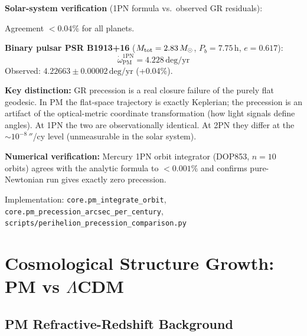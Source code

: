 \documentclass[10pt,twocolumn]{article}
\begin{document}
\textbf{Solar-system verification} (1PN formula vs.\ observed GR residuals):
\begin{center}
\end{center}
Agreement $<0.04\%$ for all planets.

\textbf{Binary pulsar PSR B1913+16} ($M_{\rm tot}=2.83\,M_\odot$, $P_b=7.75$\,h,
$e=0.617$):
\[
  \dot\omega_{\mathrm{PM}}^{\mathrm{1PN}} = 4.228\,\mathrm{deg/yr}
\]
Observed: $4.22663\pm0.00002\,\mathrm{deg/yr}$ (+0.04\%).

\textbf{Key distinction:}
GR precession is a real closure failure of the purely flat geodesic.
In PM the flat-space trajectory is exactly Keplerian; the precession is
an artifact of the optical-metric coordinate transformation (how light
signals define angles).  At 1PN the two are observationally identical.
At 2PN they differ at the $\sim10^{-8}\,''$/cy level
(unmeasurable in the solar system).

\textbf{Numerical verification:} Mercury 1PN orbit integrator (DOP853,
$n=10$ orbits) agrees with the analytic formula to $<0.001\%$ and confirms
pure-Newtonian run gives exactly zero precession.

Implementation: \texttt{core.pm\_integrate\_orbit},
\texttt{core.pm\_precession\_arcsec\_per\_century},
\texttt{scripts/perihelion\_precession\_comparison.py}

\section{Cosmological Structure Growth: PM vs $\Lambda$CDM}

\subsection*{PM Refractive-Redshift Background}
\end{document}

